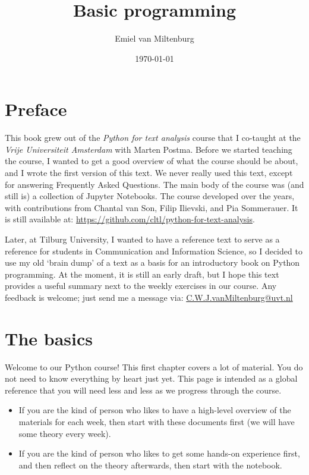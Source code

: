 \documentclass[12pt]{book}
\begin{document}
\frontmatter

\title{Basic programming}
\author{Emiel van Miltenburg}
\date{\today}
\maketitle

\chapter{Preface}
This book grew out of the \textit{Python for text analysis} course that I co-taught at the \textit{Vrije Universiteit Amsterdam} with Marten Postma. Before we started teaching the course, I wanted to get a good overview of what the course should be about, and I wrote the first version of this text. We never really used this text, except for answering Frequently Asked Questions. The main body of the course was (and still is) a collection of Jupyter Notebooks. The course developed over the years, with contributions from Chantal van Son, Filip Ilievski, and Pia Sommerauer. It is still available at: \url{https://github.com/cltl/python-for-text-analysis}.

Later, at Tilburg University, I wanted to have a reference text to serve as a reference for students in Communication and Information Science, so I decided to use my old `brain dump' of a text as a basis for an introductory book on Python programming. At the moment, it is still an early draft, but I hope this text provides a useful summary next to the weekly exercises in our course. Any feedback is welcome; just send me a message via: \href{mailto:C.W.J.vanMiltenburg@uvt.nl}{C.W.J.vanMiltenburg@uvt.nl}

\tableofcontents

\mainmatter
\chapter{The basics}

Welcome to our Python course! This first chapter covers a lot of material. You do not need to know everything by heart just yet.
This page is intended as a global reference that you will need less and less as we progress through the course.
\begin{itemize}
\item If you are the kind of person who likes to have a high-level overview of the materials for
each week, then start with these documents first (we will have some theory every week).
\item If you are the kind of person who likes to get some hands-on experience first, and then
reflect on the theory afterwards, then start with the notebook.
\end{itemize}
\end{document}
